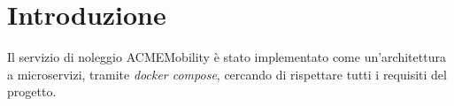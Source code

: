 \section{Introduzione}\label{sec:intro}

Il servizio di noleggio ACMEMobility è stato implementato come un'architettura a
microservizi, tramite \textit{docker compose}, cercando di rispettare tutti i
requisiti del progetto.